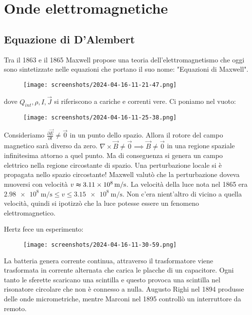 \chapter{Onde elettromagnetiche}


\section{Equazione di D'Alembert}
Tra il 1863 e il 1865 Maxwell propose una teoria dell'elettromagnetismo che oggi sono sintetizzate nelle equazioni che portano il suo nome: "Equazioni di Maxwell".
\begin{figure}[H]
	\centering
	\texttt{[image: screenshots/2024-04-16-11-21-47.png]}
\end{figure}
\noindent dove \(Q_{int}, \rho , I, \vec{J} \)	si riferiscono a cariche e correnti vere. Ci poniamo nel vuoto:
\begin{figure}[H]
	\centering
	\texttt{[image: screenshots/2024-04-16-11-25-38.png]}
\end{figure}
Consideriamo \(\frac{\partial \vec{E}}{\partial t}\neq \vec{0} \) in un punto dello spazio. Allora il rotore del campo magnetico sarà diverso da zero. \(\nabla \times \vec{B}\neq \vec{0} \implies \vec{B}\neq \vec{0} \) in una regione spaziale infinitesima attorno a quel punto. Ma di conseguenza si genera un campo elettrico nella regione circostante di spazio. Una perturbazione locale si è propagata nello spazio circostante! Maxwell valutò che la perturbazione doveva muoversi con velocità \(v\thickapprox \SI{3.11e8}{m/s}\). La velocità della luce nota nel 1865 era \(\SI{2.98e8}{\metre \per \second} \leq v \leq \SI{3.15e8}{\metre \per \second}\). Non c'era nient'altro di vicino a quella velocità, quindi si ipotizzò che la luce potesse essere un fenomeno elettromagnetico.

Hertz fece un esperimento:
\begin{figure}[H]
	\centering
	\texttt{[image: screenshots/2024-04-16-11-30-59.png]}
\end{figure}
La batteria genera corrente continua, attraverso il trasformatore viene trasformata in corrente alternata che carica le placche di un capacitore. Ogni tanto le sferette scaricano una scintilla e questo provoca una scintilla nel risonatore circolare che non è connesso a nulla. Augusto Righi nel 1894 produsse delle onde micrometriche, mentre Marconi nel 1895 controllò un interruttore da remoto.

